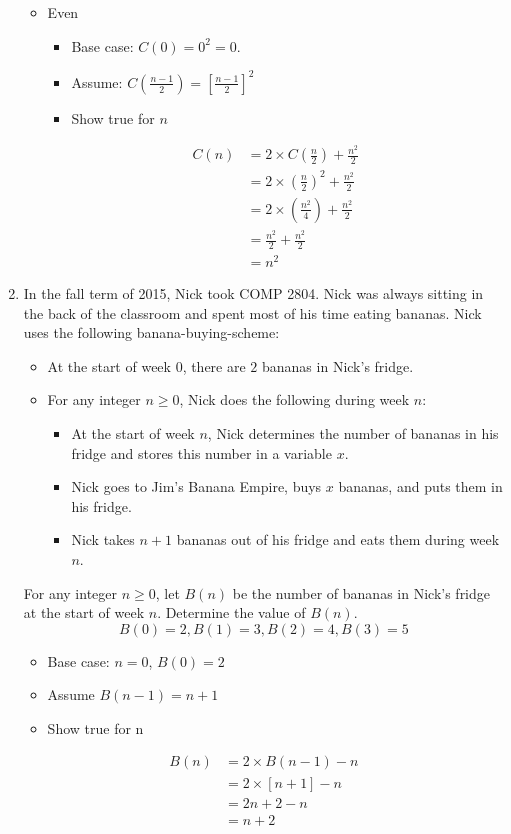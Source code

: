 \documentclass{article}
\begin{document}
\begin{enumerate}
\begin{itemize}
				\item Even
					\begin{itemize}
						\item Base case: $C(0) = 0^2 = 0.$
						\item Assume: $C(\frac{n - 1}{2}) = \left[\frac{n - 1}{2}\right]^2$
						\item Show true for $n$
					\end{itemize}

					\begin{align*}
						C(n) &=  2 \times C\left(\frac{n}{2}\right) + \frac{n^2}{2} \\
						&=  2 \times \left(\frac{n}{2}\right)^2 + \frac{n^2}{2} \\
						&=  2 \times \left(\frac{n^2}{4}\right) + \frac{n^2}{2} \\
						&=  \frac{n^2}{2} + \frac{n^2}{2} \\
						&= n^2
					\end{align*}
			\end{itemize}
		\item %
			In the fall term of 2015, Nick took COMP 2804. Nick was always sitting in the back of the classroom and spent most of his time eating bananas. Nick uses the following banana-buying-scheme: 
			\begin{itemize} 
				\item
					At the start of week $0$, there are $2$ bananas in Nick's fridge. 
				\item
					For any integer $n \geq 0$, Nick does the following during week $n$: 
					\begin{itemize} 
						\item
							At the start of week $n$, Nick determines the number of bananas in his fridge and stores this number in a variable $x$. 
						\item
							Nick goes to Jim's Banana Empire, buys $x$ bananas, and puts them in his fridge. 
						\item
							Nick takes $n+1$ bananas out of his fridge and eats them during week $n$.  
				\end{itemize}
			\end{itemize}
			For any integer $n \geq 0$, let $B(n)$ be the number of bananas in Nick's fridge at the start of week $n$. Determine the value of $B(n)$. \\
			\[
				B(0) = 2, B(1) = 3, B(2) = 4, B(3) = 5
			\]
			\begin{itemize}
				\item Base case: $n = 0$, $B(0) = 2$
				\item Assume $B(n - 1) = n + 1$
				\item Show true for n
			\end{itemize}
			\begin{align*}
				B(n) &= 2 \times B(n - 1) - n \\
				&= 2 \times [n + 1] - n \\
				&= 2n + 2 - n \\
				&= n + 2
			\end{align*}
	\end{enumerate}	
\end{document}

